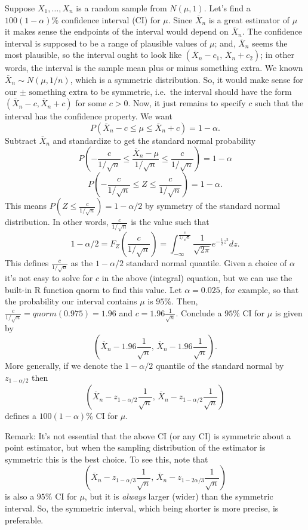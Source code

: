 \documentclass[
]{book}
\begin{document}
Suppose \(X_1, \ldots, X_n\) is a random sample from \(N(\mu, 1)\). Let's find a \(100(1-\alpha)\%\) confidence interval (CI) for \(\mu\). Since \(\overline X_n\) is a great estimator of \(\mu\) it makes sense the endpoints of the interval would depend on \(\overline X_n\). The confidence interval is supposed to be a range of plausible values of \(\mu\); and, \(\overline X_n\) seems the most plausible, so the interval ought to look like \((\overline X_n - c_1, \, \overline X_n + c_2)\); in other words, the interval is the sample mean plus or minus something extra. We known \(\overline X_n \sim N(\mu, 1/n)\), which is a symmetric distribution. So, it would make sense for our \(\pm \text{ something extra}\) to be symmetric, i.e.~the interval should have the form \((\overline X_n - c, \overline X_n + c)\) for some \(c>0\). Now, it just remains to specify \(c\) such that the interval has the confidence property. We want
\[P(\overline X_n - c \leq \mu \leq \overline X_n +c) = 1-\alpha.\]
Subtract \(\overline X_n\) and standardize to get the standard normal probability
\[P\left(-\frac{c}{1/\sqrt{n}} \leq \frac{\overline X_n - \mu}{1/\sqrt{n}} \leq \frac{c}{1/\sqrt{n}}\right) = 1-\alpha\]
\[P\left(-\frac{c}{1/\sqrt{n}} \leq Z \leq \frac{c}{1/\sqrt{n}}\right) = 1-\alpha.\]
This means \(P(Z\leq \frac{c}{1/\sqrt{n}}) = 1-\alpha/2\) by symmetry of the standard normal distribution. In other words, \(\frac{c}{1/\sqrt{n}}\) is the value such that
\[1-\alpha/2=F_Z(\frac{c}{1/\sqrt{n}})=\int_{-\infty}^{\frac{c}{1/\sqrt{n}}} \frac{1}{\sqrt{2\pi}}e^{-\frac{1}{2}z^2}dz.\]
This defines \(\frac{c}{1/\sqrt{n}}\) as the \(1-\alpha/2\) standard normal quantile. Given a choice of \(\alpha\) it's not easy to solve for \(c\) in the above (integral) equation, but we can use the built-in R function qnorm to find this value. Let \(\alpha = 0.025\), for example, so that the probability our interval contains \(\mu\) is \(95\%\). Then, \(\frac{c}{1/\sqrt{n}} = qnorm(0.975) = 1.96\) and \(c = 1.96\frac{1}{\sqrt{n}}\). Conclude a \(95\%\) CI for \(\mu\) is given by
\[\left(\overline X_n - 1.96\frac{1}{\sqrt{n}}, \,\overline X_n - 1.96\frac{1}{\sqrt{n}}\right).\]
More generally, if we denote the \(1-\alpha/2\) quantile of the standard normal by \(z_{1-\alpha/2}\) then
\[\left(\overline X_n - z_{1-\alpha/2}\frac{1}{\sqrt{n}}, \,\overline X_n - z_{1-\alpha/2}\frac{1}{\sqrt{n}}\right)\]
defines a \(100(1-\alpha)\%\) CI for \(\mu\).

Remark: It's not essential that the above CI (or any CI) is symmetric about a point estimator, but when the sampling distribution of the estimator is symmetric this is the best choice. To see this, note that
\[\left(\overline X_n - z_{1-\alpha/3}\frac{1}{\sqrt{n}}, \,\overline X_n - z_{1-2\alpha/3}\frac{1}{\sqrt{n}}\right)\]
is also a \(95\%\) CI for \(\mu\), but it is \emph{always} larger (wider) than the symmetric interval. So, the symmetric interval, which being shorter is more precise, is preferable.
\end{document}
